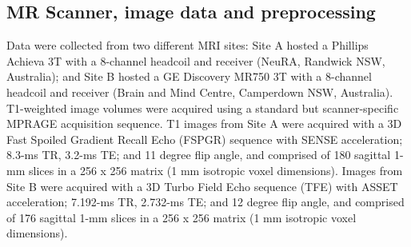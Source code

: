 \subsection{MR Scanner, image data and preprocessing}
Data were collected from two different MRI sites: Site A hosted a Phillips Achieva 3T with a 8-channel headcoil and receiver (NeuRA, Randwick NSW, Australia); and Site B hosted a GE Discovery MR750 3T with a 8-channel headcoil and receiver (Brain and Mind Centre, Camperdown NSW, Australia). T1-weighted image volumes were acquired using a standard but scanner-specific MPRAGE acquisition sequence. T1 images from Site A were acquired with a 3D Fast Spoiled Gradient Recall Echo (FSPGR) sequence with SENSE acceleration; 8.3-ms TR, 3.2-ms TE; and 11 degree flip angle, and comprised of 180 sagittal 1-mm slices in a 256 x 256 matrix (1 mm isotropic voxel dimensions). Images from Site B were acquired with a 3D Turbo Field Echo sequence (TFE) with ASSET acceleration; 7.192-ms TR, 2.732-ms TE; and 12 degree flip angle, and comprised of 176 sagittal 1-mm slices in a 256 x 256 matrix (1 mm isotropic voxel dimensions).

